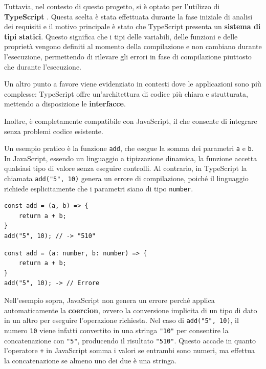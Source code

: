 \documentclass[target=bach,aauheader=,style=]{thud}
\begin{document}
\noindent Tuttavia, nel contesto di questo progetto, si è optato per l'utilizzo di \textbf{TypeScript} \cite{wikipedia:typescript}. Questa scelta è stata effettuata durante la fase iniziale di analisi dei requisiti e il motivo principale è stato che TypeScript presenta un \textbf{sistema di tipi statici}. Questo significa che i tipi delle variabili, delle funzioni e delle proprietà vengono definiti al momento della compilazione e non cambiano durante l'esecuzione, permettendo di rilevare gli errori in fase di compilazione piuttosto che durante l'esecuzione. 

\noindent Un altro punto a favore viene evidenziato in contesti dove le applicazioni sono più complesse: TypeScript offre un'architettura di codice più chiara e strutturata, mettendo a disposizione le \textbf{interfacce}. 

\noindent Inoltre, è completamente compatibile con JavaScript, il che consente di integrare senza problemi codice esistente. 

\noindent Un esempio pratico è la funzione \texttt{add}, che esegue la somma dei parametri \texttt{a} e \texttt{b}. In JavaScript, essendo un linguaggio a tipizzazione dinamica, la funzione accetta qualsiasi tipo di valore senza eseguire controlli. Al contrario, in TypeScript la chiamata \texttt{add("5", 10)} genera un errore di compilazione, poiché il linguaggio richiede esplicitamente che i parametri siano di tipo \texttt{number}.

\begin{minipage}[t]{0.45\textwidth}
    \begin{lstlisting}[caption=Coercion in JavaScript]
const add = (a, b) => {
    return a + b;
}   
add("5", 10); // -> "510"
    \end{lstlisting}
\end{minipage}
\hfill
\begin{minipage}[t]{0.45\textwidth}
    \begin{lstlisting}[caption=Errore in TypeScript]
const add = (a: number, b: number) => {
    return a + b;
}  
add("5", 10); -> // Errore
    \end{lstlisting}
\end{minipage}

\noindent Nell'esempio sopra, JavaScript non genera un errore perché applica automaticamente la \textbf{coercion}, ovvero la conversione implicita di un tipo di dato in un altro per eseguire l'operazione richiesta. Nel caso di \texttt{add("5", 10)}, il numero \texttt{10} viene infatti convertito in una stringa \texttt{"10"} per consentire la concatenazione con \texttt{"5"}, producendo il risultato \texttt{"510"}. Questo accade in quanto l'operatore \texttt{+} in JavaScript somma i valori se entrambi sono numeri, ma effettua la concatenazione se almeno uno dei due è una stringa.
\end{document}
